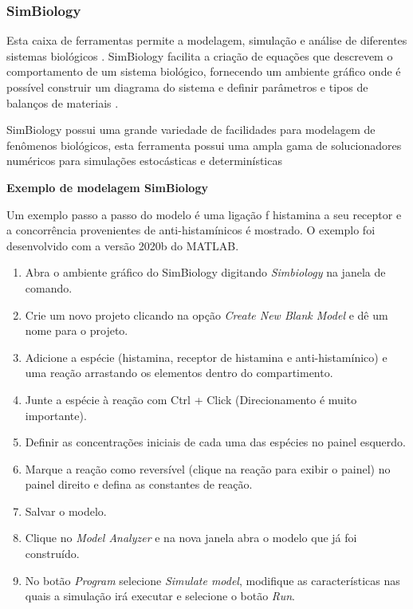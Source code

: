 \documentclass[11pt, letterpaper, portuguese]{article}
\begin{document}
        \subsubsection{SimBiology}
        \par{Esta caixa de ferramentas permite a modelagem, simulação e análise de diferentes sistemas biológicos \cite{Kirouac2019}. SimBiology facilita a criação de equações que descrevem o comportamento de um sistema biológico, fornecendo um ambiente gráfico onde é possível construir um diagrama do sistema e definir parâmetros e tipos de balanços de materiais \cite{Feigelman2016}.}
        \par{SimBiology possui uma grande variedade de facilidades para modelagem de fenômenos biológicos, esta ferramenta possui uma ampla gama de solucionadores numéricos para simulações estocásticas e determinísticas \cite{Ullah2006}}\\
        \par{\textbf{Exemplo de modelagem SimBiology}}
        \par{Um exemplo passo a passo do modelo é uma ligação f histamina a seu receptor e a concorrência provenientes de anti-histamínicos é mostrado. O exemplo foi desenvolvido com a versão 2020b do MATLAB.}
            \begin{enumerate}[1.]
                \item Abra o ambiente gráfico do SimBiology digitando \textit{Simbiology} na janela de comando.
                \item Crie um novo projeto clicando na opção \textit{Create New Blank Model} e dê um nome para o projeto.
                \item Adicione a espécie (histamina, receptor de histamina e anti-histamínico) e uma reação arrastando os elementos dentro do compartimento.
                \item Junte a espécie à reação com Ctrl + Click (Direcionamento é muito importante).
                \item Definir as concentrações iniciais de cada uma das espécies no painel esquerdo.
                \item Marque a reação como reversível (clique na reação para exibir o painel) no painel direito e defina as constantes de reação. 
                \item Salvar o modelo.
                \item Clique no \textit{Model Analyzer} e na nova janela abra o modelo que já foi construído.
                \item No botão  \textit{Program} selecione \textit{Simulate model}, modifique as características nas quais a simulação irá executar e selecione o botão \textit{Run}.
            \end{enumerate}
            
\end{document}
